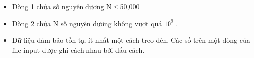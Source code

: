 \begin{itemize}
	\item     Dòng 1 chứa số nguyên dương N ≤ 50,000   
	\item     Dòng 2 chứa N số nguyên dương không vượt quá $10^{9}$    .   
	\item     Dữ liệu đảm bảo tồn tại ít nhất một cách treo đèn. Các số trên một dòng của file input được ghi cách nhau bởi dấu cách.   
\end{itemize}